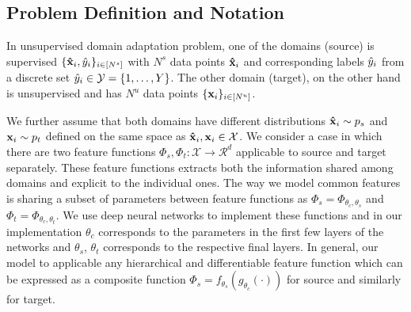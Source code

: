 
\subsection{Problem Definition and Notation}
\label{prob:def}
In unsupervised domain adaptation problem, one of the domains (source) is supervised $\{\mathbf{\hat{x}}_i, \hat{y}_i \}_{i \in [N^s]}$ with $N^s$ data points $\mathbf{\hat{x}}_i$ and corresponding labels $\hat{y}_i$ from a discrete set $\hat{y}_i \in \mathcal{Y} = \{1,\ldots, Y \}$.  The other domain (target), on the other hand is unsupervised and has $N^u$ data points $\{\mathbf{x}_i \}_{i \in [N^u]}$. 

We further assume that both domains have different distributions $\mathbf{\hat{x}}_i \sim p_s$ and $\mathbf{x}_i \sim p_t$ defined on the same space as $\mathbf{\hat{x}}_i,\mathbf{x}_i \in \mathcal{X}$. We consider a case in which there are two feature functions  \mbox{$\Phi_s, \Phi_t:\mathcal{X}\rightarrow \mathcal{R}^d$} applicable to source and target separately. These feature functions extracts both the information shared among domains and explicit to the individual ones. The way we model common features is sharing a subset of parameters between feature functions as \mbox{$\Phi_s=\Phi_{\theta_c,\theta_s}$} and \mbox{$\Phi_t=\Phi_{\theta_c,\theta_t}$}. We use deep neural networks to implement these functions and in our implementation $\theta_c$ corresponds to the parameters in the first few layers of the networks and $\theta_s$, $\theta_t$ corresponds to the respective final layers. In general, our model to applicable any hierarchical and differentiable feature function which can be expressed as a composite function $\Phi_s = f_{\theta_s}(g_{\theta_c}(\cdot))$ for source and similarly for target.

